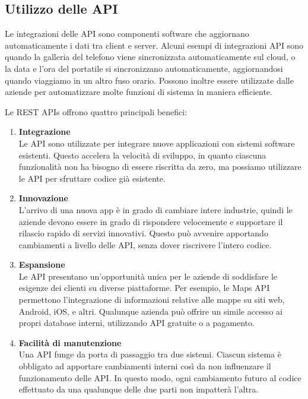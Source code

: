 \subsection{Utilizzo delle API}
Le integrazioni delle API sono componenti software che aggiornano automaticamente i dati tra client e server. Alcuni esempi di integrazioni API sono quando la galleria del telefono viene sincronizzata automaticamente sul cloud, o la data e l'ora del portatile si sincronizzano automaticamente, aggiornandosi quando viaggiamo in un altro fuso orario. Possono inoltre essere utilizzate dalle aziende per automatizzare molte funzioni di sistema in maniera efficiente.

Le REST APIs offrono quattro principali benefici:
\begin{enumerate}
    \item \textbf{Integrazione}\\
    Le API sono utilizzate per integrare nuove applicazioni con sistemi software esistenti. Questo accelera la velocità di sviluppo, in quanto ciascuna funzionalità non ha bisogno di essere riscritta da zero, ma possiamo utilizzare le API per sfruttare codice già esistente.
    \item \textbf{Innovazione}\\
    L'arrivo di una nuova app è in grado di cambiare intere industrie, quindi le aziende devono essere in grado di rispondere velocemente e supportare il rilascio rapido di servizi innovativi. Questo può avvenire apportando cambiamenti a livello delle API, senza dover riscrivere l'intero codice.
    \item \textbf{Espansione}\\
    Le API presentano un'opportunità unica per le aziende di soddisfare le esigenze dei clienti su diverse piattaforme. Per esempio, le Maps API permettono l'integrazione di informazioni relative alle mappe su siti web, Android, iOS, e altri. Qualunque azienda può offrire un simile accesso ai propri database interni, utilizzando API gratuite o a pagamento.
    \item \textbf{Facilità di manutenzione}\\
    Una API funge da porta di passaggio tra due sistemi. Ciascun sistema è obbligato ad apportare cambiamenti interni così da non influenzare il funzionamento delle API. In questo modo, ogni cambiamento futuro al codice effettuato da una qualunque delle due parti non impatterà l'altra.
\end{enumerate}

